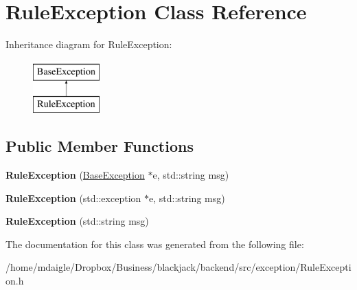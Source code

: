 \hypertarget{classRuleException}{
\section{\-Rule\-Exception \-Class \-Reference}
\label{d3/d7b/classRuleException}
}
\-Inheritance diagram for \-Rule\-Exception\-:\begin{figure}[H]
\begin{center}
\leavevmode
\includegraphics[height=2.000000cm]{d3/d7b/classRuleException}
\end{center}
\end{figure}
\subsection*{\-Public \-Member \-Functions}
\begin{DoxyCompactItemize}
\item 
\hypertarget{classRuleException_aeda01571aa25810ba95330ebdc181fef}{
{\bfseries \-Rule\-Exception} (\hyperlink{classBaseException}{\-Base\-Exception} $\ast$e, std\-::string msg)}
\label{d3/d7b/classRuleException_aeda01571aa25810ba95330ebdc181fef}

\item 
\hypertarget{classRuleException_a66291e7d18178478ca94e2a63b43de5a}{
{\bfseries \-Rule\-Exception} (std\-::exception $\ast$e, std\-::string msg)}
\label{d3/d7b/classRuleException_a66291e7d18178478ca94e2a63b43de5a}

\item 
\hypertarget{classRuleException_ab61e34f9bccf5acdd7a5c3df7d4c7b3c}{
{\bfseries \-Rule\-Exception} (std\-::string msg)}
\label{d3/d7b/classRuleException_ab61e34f9bccf5acdd7a5c3df7d4c7b3c}

\end{DoxyCompactItemize}


\-The documentation for this class was generated from the following file\-:\begin{DoxyCompactItemize}
\item 
/home/mdaigle/\-Dropbox/\-Business/blackjack/backend/src/exception/\-Rule\-Exception.\-h\end{DoxyCompactItemize}
